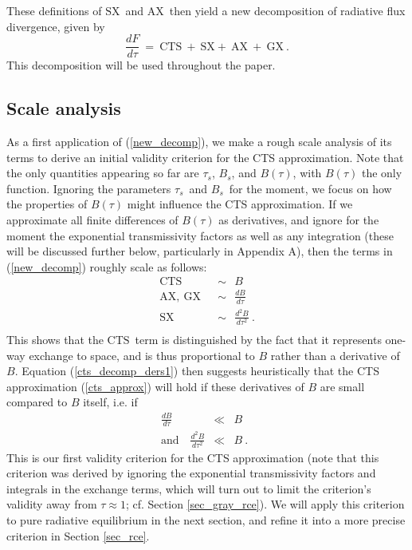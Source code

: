 \documentclass{ametsoc}
\newcommand{\beqn}{\begin{equation}}
\newcommand{\eeqn}{\end{equation}}
\newcommand{\beqa}{\begin{eqnarray}}
\newcommand{\eeqa}{\end{eqnarray}}
\newcommand{\eqnref}[1]{(\ref{#1})}
\newcommand{\der}[2]{\ensuremath{\frac{d #1}{d #2}}}
\newcommand{\ddtau}[1]{\ensuremath{\frac{d #1}{d\tau}}}
\newcommand{\taus}{\ensuremath{\tau_s}}
\newcommand{\Bs}{\ensuremath{B_s}}
\newcommand{\SX}{\ensuremath{\mathrm{SX}}}
\newcommand{\AX}{\ensuremath{\mathrm{AX}}}
\newcommand{\GX}{\ensuremath{\mathrm{GX}}}
\newcommand{\CTS}{\ensuremath{\mathrm{CTS}}}
\begin{document}
These definitions of \SX\ and \AX\ then yield a new decomposition of radiative flux divergence,  given by 
	\beqn
		\ddtau{F} \ = \ \CTS \ + \ \SX + \ \AX \ + \  \GX \  . 
		\label{new_decomp}
	\eeqn
This decomposition will be used throughout the paper.

\subsection{Scale analysis} \label{sec_scale}	
As a first application of \eqnref{new_decomp}, we make a rough scale analysis of its terms to derive an initial validity criterion for the CTS approximation. Note that the only quantities appearing so far are \taus, \Bs, and $B(\tau)$, with $B(\tau)$ the only function. Ignoring the parameters \taus\ and \Bs\ for the moment, we focus on how the properties of  $B(\tau)$ might influence the CTS approximation.  If we approximate all finite differences of $B(\tau)$ as derivatives, and ignore for the moment the exponential transmissivity factors  as well as any integration (these will be discussed further below, particularly in Appendix A), then the terms in \eqnref{new_decomp} roughly scale as follows:
\beqn
	\begin{split}
		\CTS \ & \ \sim \  \ B \\
		\AX, \ \GX	 \ & \ \sim \ \ \frac{d B}{d \tau} \\
		\SX	 \ & \ \sim \ \ \frac{d^2 B}{d \tau^2}  \ .\\
	\end{split}
	\label{cts_decomp_ders1}
\eeqn
This shows that the \CTS\ term is distinguished by the fact that it represents one-way exchange to space, and is thus proportional to $B$ rather than a derivative of $B$. Equation \eqnref{cts_decomp_ders1} then suggests heuristically that the CTS approximation \eqnref{cts_approx} will hold if these derivatives of $B$ are small compared to $B$ itself, i.e. if 
\begin{subequations}
	\beqa
		\der{B}{\tau} &  \ll &  B \label{cts_dbdt} \quad  \\
		\text{and} \quad		\frac{d^2 B}{d \tau^2} & \ll & B \ . \label{cts_db2dt2}
	\eeqa
	\label{cts_criterion1}
\end{subequations}
This is our first  validity criterion for the CTS approximation (note that this criterion was derived by ignoring the exponential transmissivity factors  and integrals in the exchange terms, which will turn out to limit the criterion's validity away from $\tau\approx 1$; cf. Section \ref{sec_gray_rce}).  We will apply this criterion to pure radiative equilibrium in the next section, and refine it into a more precise criterion in Section \ref{sec_rce}. 
\end{document}
